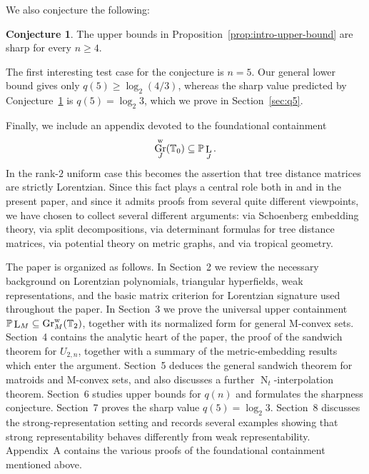 \documentclass[12pt]{amsart}
\theoremstyle{definition}
\newtheorem{conjecture}[theorem]{Conjecture}
\newcommand{\1}{\mathbf{1}}
\DeclareMathOperator{\upN}{N}   %
\DeclareMathOperator{\upL}{L}   %
\DeclareMathOperator{\Gr}{Gr}
\renewcommand\P{{\mathbb P}}
\newcommand\T{{\mathbb T}}
\newcommand\ol{\texorpdfstring{\textbf{Oliver:} }{Oliver: }}
\begin{document}
We also conjecture the following:

\begin{conjecture}
\label{conj:intro-sharp}
The upper bounds in Proposition~\ref{prop:intro-upper-bound} are sharp for every
$n\ge 4$.
\end{conjecture}

The first interesting test case for the conjecture is $n=5$. Our general lower bound gives only $q(5)\ge \log_2(4/3)$,
whereas the sharp value predicted by Conjecture~\ref{conj:intro-sharp} is $q(5)=\log_2 3$, which we prove in Section~\ref{sec:q5}.

\medskip

Finally, we include an appendix devoted to the foundational containment
\[
\Gr^{\rm w}_J(\T_0)\subseteq \P\upL_J.
\]
In the rank-$2$ uniform case this becomes the assertion that tree distance matrices are strictly Lorentzian. Since this fact plays a central role both in \cite{Branden-Huh20} and in the present paper, and since it admits proofs from several quite different viewpoints, we have chosen to collect several different arguments: via Schoenberg embedding theory, via split decompositions, via determinant formulas for tree distance matrices, via potential theory on metric graphs, and via tropical geometry.

\medskip

The paper is organized as follows. 
In Section~2 we review the necessary background on Lorentzian polynomials,
triangular hyperfields, weak representations, and the basic matrix criterion for
Lorentzian signature used throughout the paper. In Section~3 we prove the universal upper containment $\P\upL_M\subseteq \Gr^{\rm w}_M(\T_2)$, together with its normalized form for general M-convex sets. Section~4 contains the analytic heart of the paper, the proof of the sandwich theorem for $U_{2,n}$, together with a summary of the metric-embedding results which enter the argument. Section~5 deduces the general sandwich theorem for matroids and M-convex sets, and also discusses a further $\upN_t$-interpolation theorem. Section~6 studies upper bounds for $q(n)$ and formulates the sharpness conjecture. Section~7 proves the sharp value $q(5)=\log_2 3$. 
Section~8 discusses the strong-representation setting and records several examples
showing that strong representability behaves differently from weak
representability. Appendix~A contains the various proofs of the foundational containment mentioned above.

\end{document}
